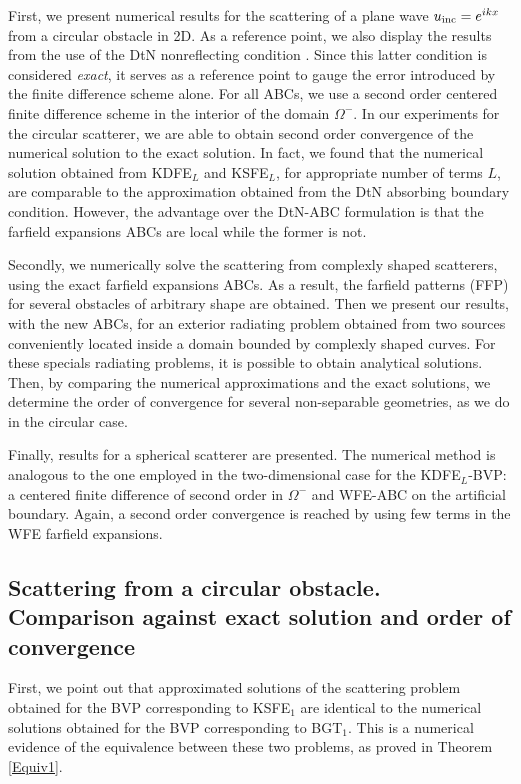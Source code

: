 \documentclass[final,3p,times,12pt]{elsarticle}
\newcommand{\uinc}{u_{\rm inc}}
\begin{document}
First, we present numerical results for the scattering of a plane wave $\uinc= e^{ikx}$ from a circular obstacle in 2D. As a reference point, we also display the results from the use of the DtN nonreflecting condition \cite{Keller01,Givoli05,Grote-Keller01,GivoliReview}. Since this latter condition is considered \textit{exact}, it serves as a reference point to gauge the error introduced by the finite difference scheme alone. For all ABCs, we use a second order centered finite difference scheme in the interior of the domain $\Omega^{-}.$  In our experiments for the circular scatterer, we are able to obtain second order convergence of the numerical solution to the exact solution. In fact, we found that the numerical solution obtained from KDFE$_L$ and KSFE$_{L}$, for appropriate number of terms $L$, are comparable to the approximation obtained from the DtN absorbing boundary condition. However, the advantage over the DtN-ABC formulation is that the farfield expansions ABCs are local while the former is not. 

Secondly, we numerically solve the scattering from complexly shaped scatterers, using the exact farfield expansions ABCs. As a result, the farfield patterns (FFP) for several obstacles of arbitrary shape are obtained. Then we present our results, with the new ABCs, for an exterior radiating problem obtained from two sources conveniently located inside a domain bounded by complexly shaped curves.   {For these specials radiating problems, it is possible to obtain analytical solutions.} Then, by comparing the numerical approximations and the exact solutions, we determine the order of convergence for several non-separable geometries, as we do in the circular case.

Finally, results for a spherical scatterer are presented.  The numerical method is analogous to the one employed in the two-dimensional case for the KDFE$_L$-BVP: a centered finite difference of second order in  $\Omega^{-}$ and WFE-ABC on the artificial boundary. Again, a second order convergence is reached by using few terms in the WFE farfield expansions. 

\subsection{Scattering from a circular obstacle. Comparison against exact solution and order of convergence}
\label{orderconverg2D}
First, we point out that approximated solutions of the scattering problem obtained for the BVP corresponding to KSFE$_1$ are identical to the numerical solutions obtained for the BVP corresponding to BGT$_1$. This is a numerical evidence of the equivalence between these two problems, as proved in Theorem \ref{Equiv1}. 
\end{document}
